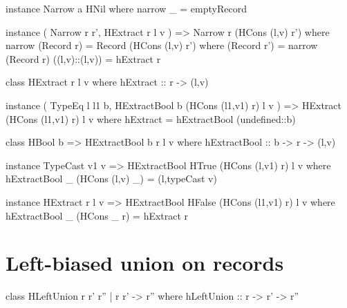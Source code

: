\begin{code}
 instance Narrow a HNil
  where   narrow _ = emptyRecord
\end{code}

\begin{code}
 instance ( Narrow r r', HExtract r l v
          ) => Narrow r (HCons (l,v) r')
  where
    narrow (Record r) = Record (HCons (l,v) r')
      where
        (Record r')    = narrow (Record r)
        ((l,v)::(l,v)) = hExtract r
\end{code}

\begin{code}
 class  HExtract r l v
  where hExtract :: r -> (l,v)
\end{code}

\begin{code}
 instance ( TypeEq l l1 b, HExtractBool b (HCons (l1,v1) r) l v
          ) => HExtract (HCons (l1,v1) r) l v
  where hExtract = hExtractBool (undefined::b)
\end{code}

\begin{code}
 class HBool b => HExtractBool b r l v
  where hExtractBool :: b -> r -> (l,v)
\end{code}

\begin{code}
 instance TypeCast v1 v => HExtractBool HTrue (HCons (l,v1) r) l v
  where hExtractBool _ (HCons (l,v) _) = (l,typeCast v)
\end{code}

\begin{code}
 instance HExtract r l v => HExtractBool HFalse (HCons (l1,v1) r) l v
  where hExtractBool _ (HCons _ r) = hExtract r
\end{code}






\section{Left-biased union on records}
\label{A:hLeftUnion}


\begin{code}
 class  HLeftUnion r r' r'' | r r' -> r''
  where hLeftUnion :: r -> r' -> r''
\end{code}

